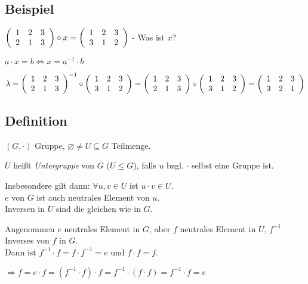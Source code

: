  
 \subsection{Beispiel}
 $
 \aMatrix{ccc}{
 	1 & 2 & 3 \\
 	2 & 1 & 3
 	}\circ
 	x =
 \aMatrix{ccc}{
 	1 & 2 & 3 \\
 	3 & 1 & 2
 	}
 	$
 - Was ist $x$?
 
 $ a \cdot x = b \Leftrightarrow x=a^{-1} \cdot b$
 
 $
 \lambda =
  \aMatrix{ccc}{
  	1 & 2 & 3 \\
  	2 & 1 & 3
  }^{-1}\circ
 \aMatrix{ccc}{
 	1 & 2 & 3 \\
 	3 & 1 & 2
 } = 
  \aMatrix{ccc}{
  	1 & 2 & 3 \\
  	2 & 1 & 3
  }\circ
  \aMatrix{ccc}{
  	1 & 2 & 3 \\
  	3 & 1 & 2
  } =
  \aMatrix{ccc}{
  	1 & 2 & 3 \\
  	3 & 2 & 1
  }
  $

\subsection{Definition}

$(G,\cdot)$ Gruppe, $\varnothing \neq U \subseteq G$ Teilmenge.

$U$ heißt \emph{Untergruppe} von $G$ ($U\leqslant G$), falls $u$ bzgl. $\cdot$ selbst eine Gruppe ist.

Insbesondere gilt dann:
$\forall u,v \in U$ ist $u \cdot v \in  U$.\\
$e$ von $G$ ist auch neutrales Element von $u$.\\
Inversen in $U$ sind die gleichen wie in $G$.

Angenommen $e$ neutrales Element in $G$, aber $f$ neutrales Element in $U$, $f^{-1}$ Inverses von $f$ in $G$.\\
Dann ist $f^{-1} \cdot f= f \cdot f^{-1} = e$ und $f\cdot f = f$.

$\Rightarrow f = e \cdot f = (f^{-1} \cdot f) \cdot f = f^{-1} \cdot (f \cdot f) = f^{-1} \cdot f = e$

